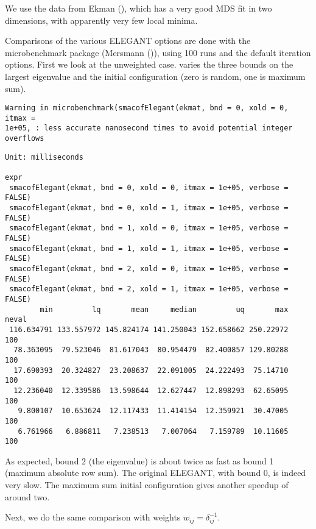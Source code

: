 \documentclass[
  12pt,
  letterpaper,
  DIV=11,
  numbers=noendperiod]{scrartcl}
\begin{document}
We use the data from Ekman (), which has a
very good MDS fit in two dimensions, with apparently very few local
minima.

Comparisons of the various ELEGANT options are done with the
microbenchmark package (Mersmann ()),
using 100 runs and the default iteration options. First we look at the
unweighted case. varies the three bounds on the largest eigenvalue and
the initial configuration (zero is random, one is maximum sum).

\begin{verbatim}
Warning in microbenchmark(smacofElegant(ekmat, bnd = 0, xold = 0, itmax =
1e+05, : less accurate nanosecond times to avoid potential integer overflows
\end{verbatim}

\begin{verbatim}
Unit: milliseconds
                                                                    expr
 smacofElegant(ekmat, bnd = 0, xold = 0, itmax = 1e+05, verbose = FALSE)
 smacofElegant(ekmat, bnd = 0, xold = 1, itmax = 1e+05, verbose = FALSE)
 smacofElegant(ekmat, bnd = 1, xold = 0, itmax = 1e+05, verbose = FALSE)
 smacofElegant(ekmat, bnd = 1, xold = 1, itmax = 1e+05, verbose = FALSE)
 smacofElegant(ekmat, bnd = 2, xold = 0, itmax = 1e+05, verbose = FALSE)
 smacofElegant(ekmat, bnd = 2, xold = 1, itmax = 1e+05, verbose = FALSE)
        min         lq       mean     median         uq       max neval
 116.634791 133.557972 145.824174 141.250043 152.658662 250.22972   100
  78.363095  79.523046  81.617043  80.954479  82.400857 129.80288   100
  17.690393  20.324827  23.208637  22.091005  24.222493  75.14710   100
  12.236040  12.339586  13.598644  12.627447  12.898293  62.65095   100
   9.800107  10.653624  12.117433  11.414154  12.359921  30.47005   100
   6.761966   6.886811   7.238513   7.007064   7.159789  10.11605   100
\end{verbatim}

As expected, bound 2 (the eigenvalue) is about twice as fast as bound 1
(maximum absolute row sum). The original ELEGANT, with bound 0, is
indeed very slow. The maximum sum initial configuration gives another
speedup of around two.

Next, we do the same comparison with weights
\(w_{ij}=\delta_{ij}^{-1}\).
\end{document}
